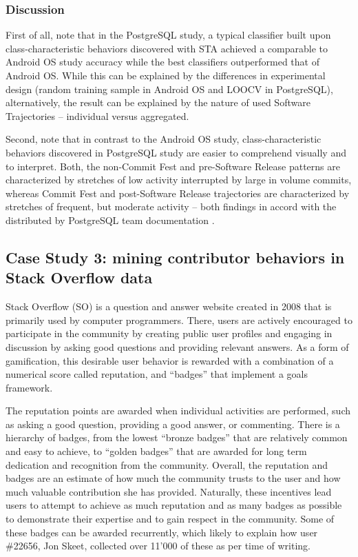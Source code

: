 \subsubsection{Discussion}
First of all, note that in the PostgreSQL study, a typical classifier built upon class-characteristic behaviors discovered with STA achieved a comparable to Android OS study accuracy while the best classifiers outperformed that of Android OS. While this can be explained by the differences in experimental design (random training sample in Android OS and LOOCV in PostgreSQL), alternatively, the result can be explained by the nature of used Software Trajectories -- individual versus aggregated.

Second, note that in contrast to the Android OS study, class-characteristic behaviors discovered in PostgreSQL study are easier to comprehend visually and to interpret. Both, the non-Commit Fest and pre-Software Release patterns are characterized by stretches of low activity interrupted by large in volume commits, whereas Commit Fest and post-Software Release trajectories are characterized by stretches of frequent, but moderate activity -- both findings in accord with the distributed by PostgreSQL team documentation \cite{commit-fest}.
\clearpage

\subsection{Case Study 3: mining contributor behaviors in Stack Overflow data}\label{case3}
Stack Overflow (SO) is a question and answer website created in 2008 that is primarily used by computer programmers. There, users are actively encouraged to participate in the community by creating public user profiles and engaging in discussion by asking good questions and providing relevant answers. As a form of gamification, this desirable user behavior is rewarded with a combination of a numerical score called reputation, and ``badges'' that implement a goals framework. 

The reputation points are awarded when individual activities are performed, such as asking a good question, providing a good answer, or commenting. There is a hierarchy of badges, from the lowest ``bronze badges'' that are relatively common and easy to achieve, to ``golden badges'' that are awarded for long term dedication and recognition from the community. Overall, the reputation and badges are an estimate of how much the community trusts to the user and how much valuable contribution she has provided. Naturally, these incentives lead users to attempt to achieve as much reputation and as many badges as possible to demonstrate their expertise and to gain respect in the community. Some of these badges can be awarded recurrently, which likely to explain how user \#22656, Jon Skeet, collected over 11'000 of these as per time of writing.

